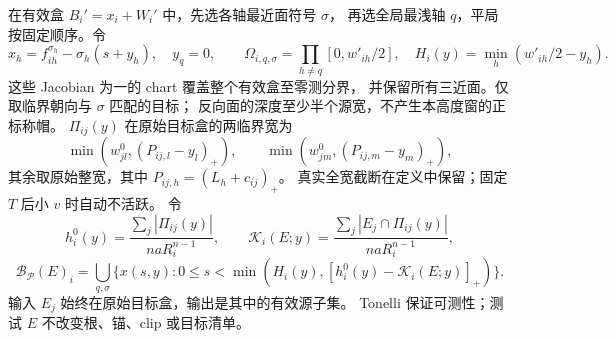 在有效盒 \(B_i'=x_i+W_i'\) 中，先选各轴最近面符号 \(\sigma\)，
再选全局最浅轴 \(q\)，平局按固定顺序。令
\[
 x_h=f_{ih}^{\sigma_h}-\sigma_h(s+y_h),\quad y_q=0,\qquad
 \Omega_{i,q,\sigma}=\prod_{h\ne q}[0,w'_{ih}/2],\quad
 H_i(y)=\min_h(w'_{ih}/2-y_h).
\]
这些 Jacobian 为一的 chart 覆盖整个有效盒至零测分界，
并保留所有三近面。仅取临界朝向与 \(\sigma\) 匹配的目标；
反向面的深度至少半个源宽，不产生本高度窗的正标称帽。
\(\Pi_{ij}(y)\) 在原始目标盒的两临界宽为
\[
 \min(w^0_{jl},(P_{ij,l}-y_l)_+),\qquad
 \min(w^0_{jm},(P_{ij,m}-y_m)_+),
\]
其余取原始整宽，其中 \(P_{ij,h}=(L_h+c_{ij})_+\)。
真实全宽截断在定义中保留；固定 \(T\) 后小 \(v\) 时自动不活跃。
令
\[
 h_i^0(y)=\frac{\sum_j|\Pi_{ij}(y)|}{naR_i^{n-1}},\qquad
 \mathcal K_i(E;y)=
       \frac{\sum_j|E_j\cap\Pi_{ij}(y)|}{naR_i^{n-1}},
\]
\begin{equation}\label{eighth:exact-operator}
 \mathscr B_{\mathscr P}(E)_i=
 \bigcup_{q,\sigma}
 \{x(s,y):0\le s<\min(H_i(y),[h_i^0(y)-\mathcal K_i(E;y)]_+)\}.
\end{equation}
输入 \(E_j\) 始终在原始目标盒，输出是其中的有效源子集。
Tonelli 保证可测性；测试 \(E\) 不改变根、锚、clip 或目标清单。

